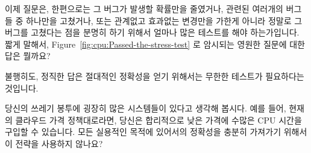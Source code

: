 이제 질문은, 한편으로는 그 버그가 발생할 확률만을 줄였거나, 관련된 여러개의
버그들 중 하나만을 고쳤거나, 또는 관계없고 효과없는 변경만을 가한게 아니라
정말로 그 버그를 고쳤다는 점을 분명히 하기 위해서 얼마나 많은 테스트를 해야
하는가입니다.
짧게 말해서,
Figure~\ref{fig:cpu:Passed-the-stress-test} 로 암시되는 영원한 질문에 대한 답은
뭘까요?

불행히도, 정직한 답은 절대적인 정확성을 얻기 위해서는 무한한 테스트가
필요하다는 것입니다.

\QuickQuiz{}
	당신의 쓰레기 봉투에 굉장히 많은 시스템들이 있다고 생각해 봅시다.
	예를 들어, 현재의 클라우드 가격 정책대로라면, 당신은 합리적으로 낮은
	가격에 수많은 CPU 시간을 구입할 수 있습니다.
	모든 실용적인 목적에 있어서의 정확성을 충분히 가져가기 위해서 이 전략을
	사용하지 않나요?
	\iffalse

